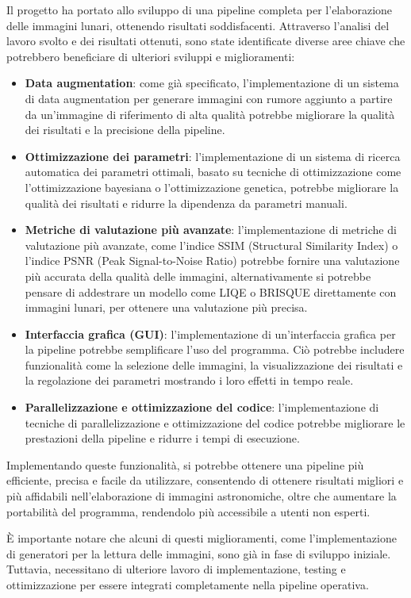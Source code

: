 Il progetto ha portato allo sviluppo di una pipeline completa per l'elaborazione delle immagini lunari, ottenendo risultati soddisfacenti. Attraverso l'analisi del lavoro svolto e dei risultati ottenuti, sono state identificate diverse aree chiave che potrebbero beneficiare di ulteriori sviluppi e miglioramenti:

\begin{itemize}
    \item \textbf{Data augmentation}: come già specificato, l'implementazione di un sistema di data augmentation per generare immagini con rumore aggiunto a partire da un'immagine di riferimento di alta qualità potrebbe migliorare la qualità dei risultati e la precisione della pipeline.
    
    \item \textbf{Ottimizzazione dei parametri}: l'implementazione di un sistema di ricerca automatica dei parametri ottimali, basato su tecniche di ottimizzazione come l'ottimizzazione bayesiana o l'ottimizzazione genetica, potrebbe migliorare la qualità dei risultati e ridurre la dipendenza da parametri manuali.
    
    \item \textbf{Metriche di valutazione più avanzate}: l'implementazione di metriche di valutazione più avanzate, come l'indice SSIM (Structural Similarity Index) o l'indice PSNR (Peak Signal-to-Noise Ratio) potrebbe fornire una valutazione più accurata della qualità delle immagini, alternativamente si potrebbe pensare di addestrare un modello come LIQE o BRISQUE direttamente con immagini lunari, per ottenere una valutazione più precisa.
    
    \item \textbf{Interfaccia grafica (GUI)}: l'implementazione di un'interfaccia grafica per la pipeline potrebbe semplificare l'uso del programma. Ciò potrebbe includere funzionalità come la selezione delle immagini, la visualizzazione dei risultati e la regolazione dei parametri mostrando i loro effetti in tempo reale.
    
    \item \textbf{Parallelizzazione e ottimizzazione del codice}: l'implementazione di tecniche di parallelizzazione e ottimizzazione del codice potrebbe migliorare le prestazioni della pipeline e ridurre i tempi di esecuzione.
\end{itemize}

Implementando queste funzionalità, si potrebbe ottenere una pipeline più efficiente, precisa e facile da utilizzare, consentendo di ottenere risultati migliori e più affidabili nell'elaborazione di immagini astronomiche, oltre che aumentare la portabilità del programma, rendendolo più accessibile a utenti non esperti.

È importante notare che alcuni di questi miglioramenti, come l'implementazione di generatori per la lettura delle immagini, sono già in fase di sviluppo iniziale. Tuttavia, necessitano di ulteriore lavoro di implementazione, testing e ottimizzazione per essere integrati completamente nella pipeline operativa.

\cleardoublepage